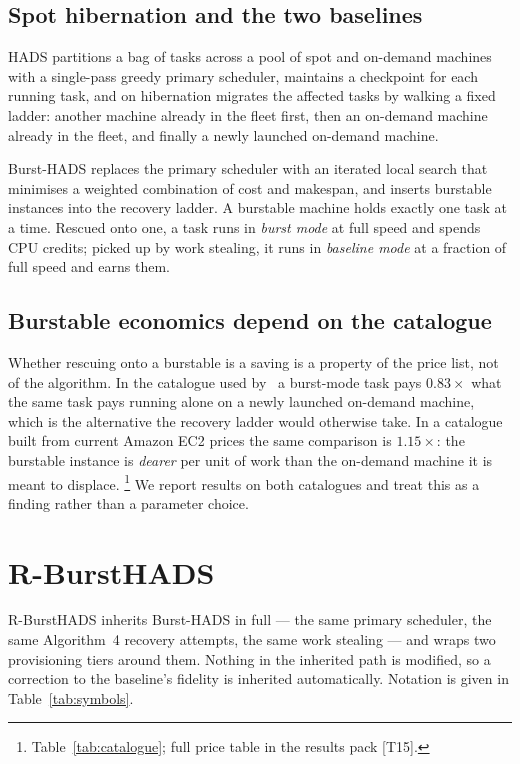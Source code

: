 \documentclass[conference]{IEEEtran}
\begin{document}
\subsection{Spot hibernation and the two baselines}

HADS partitions a bag of tasks across a pool of spot and on-demand machines with
a single-pass greedy primary scheduler, maintains a checkpoint for each running
task, and on hibernation migrates the affected tasks by walking a fixed ladder:
another machine already in the fleet first, then an on-demand machine already in
the fleet, and finally a newly launched on-demand machine.

Burst-HADS replaces the primary scheduler with an iterated local search that
minimises a weighted combination of cost and makespan, and inserts burstable
instances into the recovery ladder. A burstable machine holds exactly one task
at a time. Rescued onto one, a task runs in \emph{burst mode} at full speed and
spends CPU credits; picked up by work stealing, it runs in \emph{baseline mode}
at a fraction of full speed and earns them.

\subsection{Burstable economics depend on the catalogue}

Whether rescuing onto a burstable is a saving is a property of the price list,
not of the algorithm. In the catalogue used by~\cite{teylo2023} a burst-mode
task pays $0.83\times$ what the same task pays running alone on a newly launched
on-demand machine, which is the alternative the recovery ladder would otherwise
take. In a catalogue built from current Amazon EC2 prices the same comparison is
$1.15\times$: the burstable instance is \emph{dearer} per unit of work than the
on-demand machine it is meant to displace.%
\footnote{Table~\ref{tab:catalogue}; full price table in the results pack [T15].}
We report results on both catalogues and treat this as a finding rather than a
parameter choice.

\section{R-BurstHADS}
\label{sec:design}

R-BurstHADS inherits Burst-HADS in full --- the same primary scheduler, the same
Algorithm~4 recovery attempts, the same work stealing --- and wraps two
provisioning tiers around them. Nothing in the inherited path is modified, so a
correction to the baseline's fidelity is inherited automatically. Notation is
given in Table~\ref{tab:symbols}.
\end{document}
